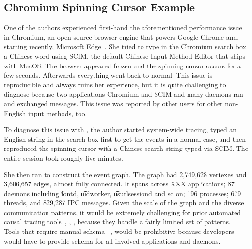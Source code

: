 \subsection{Chromium Spinning Cursor Example}


One of the authors experienced first-hand the aforementioned performance
issue in Chromium, an open-source browser engine that powers Google Chrome
and, starting recently, Microsoft Edge~\cite{chromiumurl}.  She tried to type in
the Chromium search box a Chinese word using SCIM, the default Chinese
Input Method Editor that ships with MacOS.  The browser appeared frozen
and the spinning cursor occurs for a few seconds.  Afterwards everything
went back to normal.  This issue is reproducible and always ruins her
experience, but it is quite challenging to diagnose because two
applications Chromium and SCIM and many daemons ran and exchanged
messages.  This issue was reported by other users for other non-English
input methods, too.

To diagnose this issue with \xxx, the author started system-wide tracing,
typed an English string in the search box first to get the events in a
normal case, and then reproduced the spinning cursor with a Chinese search
string typed via SCIM.  The entire session took roughly five minutes.

She then ran \xxx to construct the event graph.  The graph had 2,749,628
vertexes and 3,606,657 edges, almost fully connected.  It spans across XXX
applications; 87 daemons including \v{fontd}, \t{mdworker}, \t{nsurlsessiond}
and so on; 196 processes; 679 threads, and 829,287 IPC messages.  Given the
scale of the graph and the diverse communication patterns, it would be
extremely challenging for prior automated causal tracing
tools~\cite{aguilera2003performance}, \cite{zhang2013panappticon},
\cite{attariyan2012x}, \cite{cohen2004correlating} because they handle a fairly
limited set of patterns.  Tools that require manual
schema~\cite{barham2004using} \cite{reynolds2006pip}, would be prohibitive
because developers would have to provide schema for all involved applications
and daemons.

